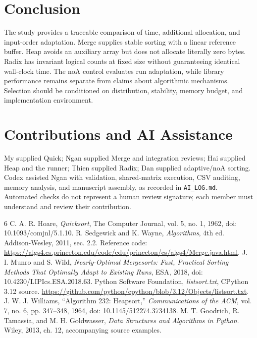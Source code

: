 \documentclass[conference]{IEEEtran}
\begin{document}
\section{Conclusion}
The study provides a traceable comparison of time, additional allocation, and input-order adaptation. Merge supplies stable sorting with a linear reference buffer. Heap avoids an auxiliary array but does not allocate literally zero bytes. Radix has invariant logical counts at fixed size without guaranteeing identical wall-clock time. The noA control evaluates run adaptation, while library performance remains separate from claims about algorithmic mechanisms. Selection should be conditioned on distribution, stability, memory budget, and implementation environment.

\section*{Contributions and AI Assistance}
My supplied Quick; Ngan supplied Merge and integration reviews; Hai supplied Heap and the runner; Thien supplied Radix; Dan supplied adaptive/noA sorting. Codex assisted Ngan with validation, shared-matrix execution, CSV auditing, memory analysis, and manuscript assembly, as recorded in \texttt{AI\_LOG.md}. Automated checks do not represent a human review signature; each member must understand and review their contribution.

\begin{thebibliography}{6}
 C. A. R. Hoare, \emph{Quicksort}, The Computer Journal, vol. 5, no. 1, 1962, doi: 10.1093/comjnl/5.1.10.
 R. Sedgewick and K. Wayne, \emph{Algorithms}, 4th ed. Addison-Wesley, 2011, sec. 2.2. Reference code: \url{https://algs4.cs.princeton.edu/code/edu/princeton/cs/algs4/Merge.java.html}.
 J. I. Munro and S. Wild, \emph{Nearly-Optimal Mergesorts: Fast, Practical Sorting Methods That Optimally Adapt to Existing Runs}, ESA, 2018, doi: 10.4230/LIPIcs.ESA.2018.63.
 Python Software Foundation, \emph{listsort.txt}, CPython 3.12 source. \url{https://github.com/python/cpython/blob/3.12/Objects/listsort.txt}.
 J. W. J. Williams, ``Algorithm 232: Heapsort,'' \emph{Communications of the ACM}, vol. 7, no. 6, pp. 347--348, 1964, doi: 10.1145/512274.3734138.
 M. T. Goodrich, R. Tamassia, and M. H. Goldwasser, \emph{Data Structures and Algorithms in Python}. Wiley, 2013, ch. 12, accompanying source examples.
\end{thebibliography}
\end{document}
